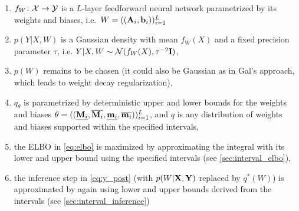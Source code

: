 \documentclass[10pt, a4paper]{article}
\begin{document}
\begin{enumerate}
  \item $f_W\colon\mathcal{X}\to\mathcal{Y}$ is a $L$-layer feedforward neural network parametrized by its weights and biases, i.e.\ $W=((\mathbf{A}_i, \mathbf{b}_i))_{i=1}^{L}$
  \item $p(Y\vert X,W)$ is a Gaussian density with mean $f_W(X)$ and a fixed precision parameter $\tau$, i.e. $Y\vert X,W \sim \mathcal{N}(f_W(X), \tau^{-2}\mathbf{I})$,
  \item $p(W)$ remains to be chosen (it could also be Gaussian as in Gal's approach, which leads to weight decay regularization),
  \item $q_\theta$ is parametrized by deterministic upper and lower bounds for the weights and biases $\theta=((\underline{\mathbf{M}_i}, \overline{\mathbf{M}_i}, \underline{\mathbf{m}_i}, \overline{\mathbf{m}_i}))_{i=1}^{L}$, and $q$ is any distribution of weights and biases supported within the specified intervals,
  \item the ELBO in \cref{eq:elbo} is maximized by approximating the integral with its lower and upper bound using
  the specified intervals (see \cref{sec:interval_elbo}),
  \item the inference step in \cref{eq:y_post} (with $p(W\vert\mathbf{X},\mathbf{Y})$ replaced by $q^\ast(W)$) is approximated by again using lower and upper bounds derived from the intervals (see \cref{sec:interval_inference})
\end{enumerate}
\end{document}
